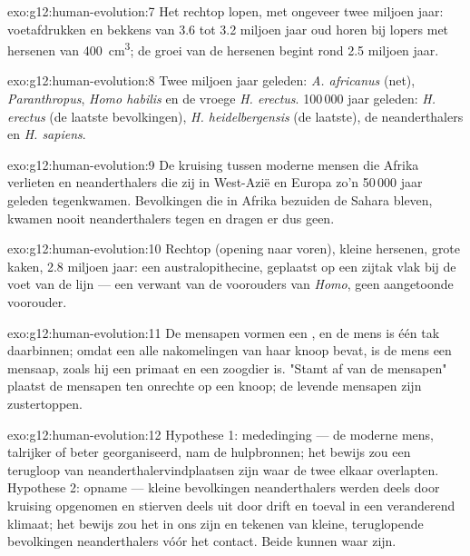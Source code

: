 \begin{solution}{exo:g12:human-evolution:7}
Het rechtop lopen, met ongeveer twee miljoen jaar: voetafdrukken en
bekkens van 3.6 tot 3.2 miljoen jaar oud horen bij lopers met hersenen van
\qty{400}{cm^3}; de groei van de hersenen begint rond 2.5 miljoen jaar.
\end{solution}

\begin{solution}{exo:g12:human-evolution:8}
Twee miljoen jaar geleden: \emph{A. africanus} (net), \emph{Paranthropus},
\emph{Homo habilis} en de vroege \emph{H. erectus}. 100\,000 jaar geleden:
\emph{H. erectus} (de laatste bevolkingen), \emph{H. heidelbergensis} (de
laatste), de neanderthalers en \emph{H. sapiens}.
\end{solution}

\begin{solution}{exo:g12:human-evolution:9}
De kruising tussen moderne mensen die Afrika verlieten en neanderthalers
die zij in West-Azië en Europa zo'n 50\,000 jaar geleden tegenkwamen.
Bevolkingen die in Afrika bezuiden de Sahara bleven, kwamen nooit
neanderthalers tegen en dragen er dus geen.
\end{solution}

\begin{solution}{exo:g12:human-evolution:10}
Rechtop (opening naar voren), kleine hersenen, grote kaken, 2.8 miljoen
jaar: een australopithecine, geplaatst op een zijtak vlak bij de voet van
de lijn --- een verwant van de voorouders van \emph{Homo}, geen aangetoonde
voorouder.
\end{solution}

\begin{solution}{exo:g12:human-evolution:11}
De mensapen vormen een , en de mens is één tak daarbinnen; omdat een
 alle nakomelingen van haar knoop bevat, is de mens een mensaap,
zoals hij een primaat en een zoogdier is. "Stamt af van de mensapen"
plaatst de mensapen ten onrechte op een knoop; de levende mensapen zijn
zustertoppen.
\end{solution}

\begin{solution}{exo:g12:human-evolution:12}
Hypothese 1: mededinging --- de moderne mens, talrijker of beter
georganiseerd, nam de hulpbronnen; het bewijs zou een terugloop van
neanderthalervindplaatsen zijn waar de twee elkaar overlapten. Hypothese
2: opname --- kleine bevolkingen neanderthalers werden deels door kruising
opgenomen en stierven deels uit door drift en toeval in een veranderend
klimaat; het bewijs zou het  in ons zijn en tekenen van
kleine, teruglopende bevolkingen neanderthalers vóór het contact. Beide
kunnen waar zijn.
\end{solution}

